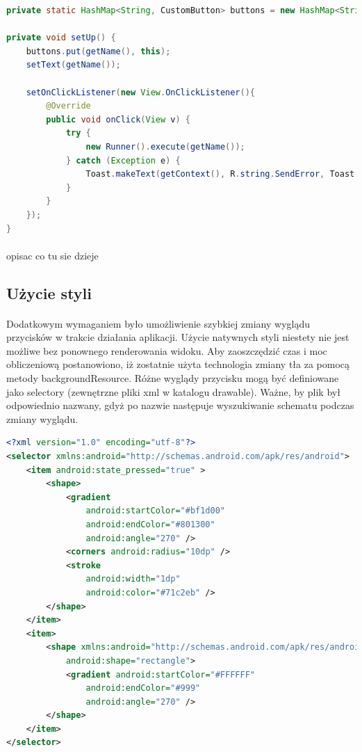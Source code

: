 \begin{lstlisting}[language=Java]
private static HashMap<String, CustomButton> buttons = new HashMap<String, CustomButton>();

private void setUp() {
    buttons.put(getName(), this);
    setText(getName());

    setOnClickListener(new View.OnClickListener(){
        @Override
        public void onClick(View v) {
            try {
                new Runner().execute(getName());
            } catch (Exception e) {
                Toast.makeText(getContext(), R.string.SendError, Toast.LENGTH_SHORT).show();
            }
        }
    });
}
\end{lstlisting}
\paragraph{}
{\color{red}opisac co tu sie dzieje}


\subsection{Użycie styli}
\paragraph{}
Dodatkowym wymaganiem było umożliwienie szybkiej zmiany wyglądu przycisków w trakcie działania aplikacji. Użycie natywnych styli niestety nie jest możliwe bez ponownego renderowania widoku. Aby zaoszczędzić czas i moc obliczeniową postanowiono, iż zostatnie użyta technologia zmiany tła za pomocą metody backgroundResource. Różne wyglądy przycisku mogą być definiowane jako selectory (zewnętrzne pliki xml w katalogu drawable). Ważne, by plik był odpowiednio nazwany, gdyż po nazwie następuje wyszukiwanie schematu podczas zmiany wyglądu.

\begin{lstlisting}[language=Xml]
<?xml version="1.0" encoding="utf-8"?>
<selector xmlns:android="http://schemas.android.com/apk/res/android">
    <item android:state_pressed="true" >
        <shape>
            <gradient
                android:startColor="#bf1d00"
                android:endColor="#801300"
                android:angle="270" />
            <corners android:radius="10dp" />
            <stroke
                android:width="1dp"
                android:color="#71c2eb" />
        </shape>
    </item>
    <item>
        <shape xmlns:android="http://schemas.android.com/apk/res/android"
            android:shape="rectangle">
            <gradient android:startColor="#FFFFFF"
                android:endColor="#999"
                android:angle="270" />
        </shape>
    </item>
</selector>
\end{lstlisting}
